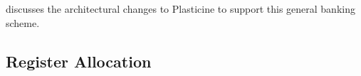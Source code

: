  discusses the architectural changes to Plasticine to support this general
banking scheme.

\subsection{Register Allocation} \label{sec:regalloc}


